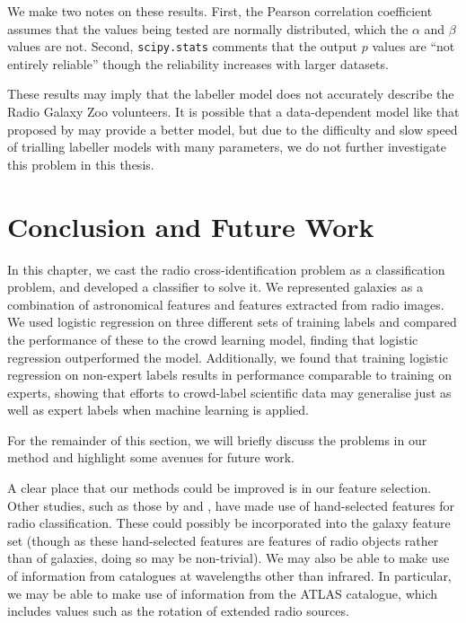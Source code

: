     We make two notes on these results. First, the Pearson correlation
    coefficient assumes that the values being tested are normally distributed,
    which the $\alpha$ and $\beta$ values are not. Second, \texttt{scipy.stats}
    comments that the output $p$ values are ``not entirely reliable'' though the
    reliability increases with larger datasets.

    These results may imply that the labeller model does not accurately describe
    the Radio Galaxy Zoo volunteers. It is possible that a data-dependent model
    like that proposed by \citeauthor{yan10} may provide a better model, but due
    to the difficulty and slow speed of trialling labeller models with many
    parameters, we do not further investigate this problem in this thesis.

\section{Conclusion and Future Work}
\label{sec:cross-identification-conclusion-future-work}
  
  In this chapter, we cast the radio cross-identification problem as a
  classification problem, and developed a classifier to solve it. We represented
  galaxies as a combination of astronomical features and features extracted from
  radio images. We used logistic regression on three different sets of training
  labels and compared the performance of these to the \citeauthor{raykar10}
  crowd learning model, finding that logistic regression outperformed the
  \citeauthor{raykar10} model. Additionally, we found that training logistic
  regression on non-expert labels results in performance comparable to training
  on experts, showing that efforts to crowd-label scientific data may generalise
  just as well as expert labels when machine learning is applied.


  For the remainder of this section, we will briefly discuss the problems in our
  method and highlight some avenues for future work.

  A clear place that our methods could be improved is in our feature selection.
  Other studies, such as those by \citet{proctor06} and \citet{fan15}, have made
  use of hand-selected features for radio classification. These could possibly
  be incorporated into the galaxy feature set (though as these hand-selected
  features are features of radio objects rather than of galaxies, doing so may
  be non-trivial). We may also be able to make use of information from
  catalogues at wavelengths other than infrared. In particular, we may be able
  to make use of information from the ATLAS catalogue, which includes values
  such as the rotation of extended radio sources.

